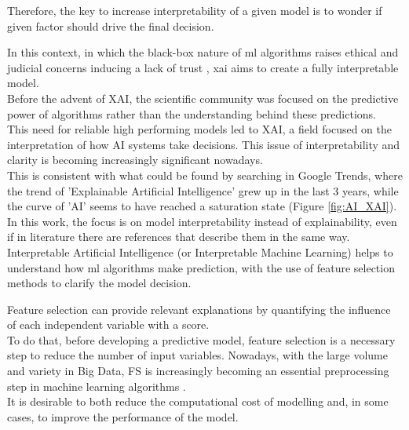 Therefore, the key to increase interpretability of a given model is to wonder if given factor should drive the final decision.\par
In this context, in which the black-box nature of \acrshort{ml} algorithms raises ethical and judicial concerns inducing a lack of trust \cite{9141213}, \gls{xai} aims to create a fully interpretable model.\\
Before the advent of XAI, the scientific community was focused on the predictive power of algorithms rather than the understanding behind these predictions.\\
This need for reliable high performing models led to XAI, a field focused on the interpretation of how AI systems take decisions.
This issue of interpretability and clarity is becoming increasingly significant nowadays. \\
This is consistent with what could be found by searching in Google Trends, where the trend of 'Explainable Artificial Intelligence' grew up in the last 3 years, while the curve of 'AI' seems to have reached a saturation state (Figure \ref{fig:AI_XAI}).\\
In this work, the focus is on model interpretability instead of explainability, even if in literature there are references that describe them in the same way.
Interpretable Artificial Intelligence (or Interpretable Machine Learning) helps to understand how \acrshort{ml} algorithms make prediction, with the use of feature selection methods to clarify the model decision.\par
Feature selection can provide relevant explanations by quantifying the influence of each independent variable with a score.\\
To do that, before developing a predictive model, feature selection is a necessary step to reduce the number of input variables. \newline
Nowadays, with the large volume and variety in Big Data, FS is increasingly becoming an essential preprocessing step in machine learning algorithms \cite{kamolov2021feature}.\\
It is desirable to both reduce the computational cost of modelling and, in some cases, to improve the performance of the model.\newline

